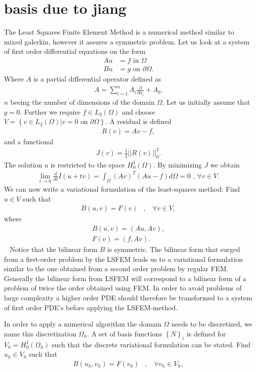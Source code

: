 \section{basis due to jiang}
\cite{Jiang}
The Least Squares Finite Element Method is a numerical method similar to mixed galerkin, however it assures a symmetric problem. Let us look at a system of first order differential equations on the form 
\begin{align}
	Au &= f \text{ in } \Omega \\
	Bu &= g \text{ on } \partial \Omega.
	\label{eq:PDE}
\end{align}
Where $A$ is a partial differential operator defined as 
\begin{align}
	A = \sum_{i = 1}^{n} A_i\frac{\partial}{\partial x_i} + A_0.
	\label{def:operatorA}
\end{align}
$n$ beeing the number of dimensions of the domain $\Omega$. Let us initially assume that $g=0$. Further we require $f \in L_2(\Omega)$ and choose $V = \left\{ v\in L_2(\Omega) | v = 0 \text{ on } \partial \Omega \right\}$. A residual is defined
\begin{align}
	R(v) = Av-f,
	\label{eq:Residual}
\end{align}
and a functional
\begin{align}
	 J(v) = \frac{1}{2}||R(v)||^2_0.
	\label{eq:Functional}
\end{align} 
The solution $u$ is restricted to the space $H^1_0(\Omega)$. By minimizing $J$ we obtain 
\begin{align}
	\lim_{t\rightarrow 0} \frac{d}{dt}I(u+tv) = \int_{\Omega}(Av)^T(Au-f)d\Omega = 0 \text{    ,   } \forall v \in V.
	\label{eq:minProb}
\end{align}
We can now write a variational formulation of the least-squares method: Find $u \in V$ such that 
\begin{align}
	B(u,v) = F(v) \; \; \; , \; \; \; \forall v \in V,
	\label{def:varForm}
\end{align}
where
\begin{align}
	B(u,v) = (Au,Av), \\
	F(v) = (f,Av).
	\label{def:bilin}
\end{align}
~\cite{Jiang}
Notice that the bilinear form $B$ is symmetric. The bilinear form that surged from a first-order problem by the LSFEM leads us to a variational formulation similar to the one obtained from a second order problem by regular FEM. Generally the bilinear form from LSFEM will correspond to a bilinear form of a problem of twice the order obtained using FEM. In order to avoid problems of large complexity a higher order PDE should therefore be transformed to a system of first order PDE's before applying the LSFEM-method. 

In order to apply a numerical algorithm the domain $\Omega$ needs to be discretized, we name this discretization $\Omega_h$. A set of basis functions $ \left\{ N \right\}_i $ is defined for $V_h = H^1_0(\Omega_h)$ such that the discrete variational formulation can be stated. Find $u_h \in V_h$ such that 
\begin{align}
	B(u_h,v_h) = F(v_h) \; \; \; , \; \; \; \forall v_h \in V_h,
	\label{def:varForm}
\end{align}
